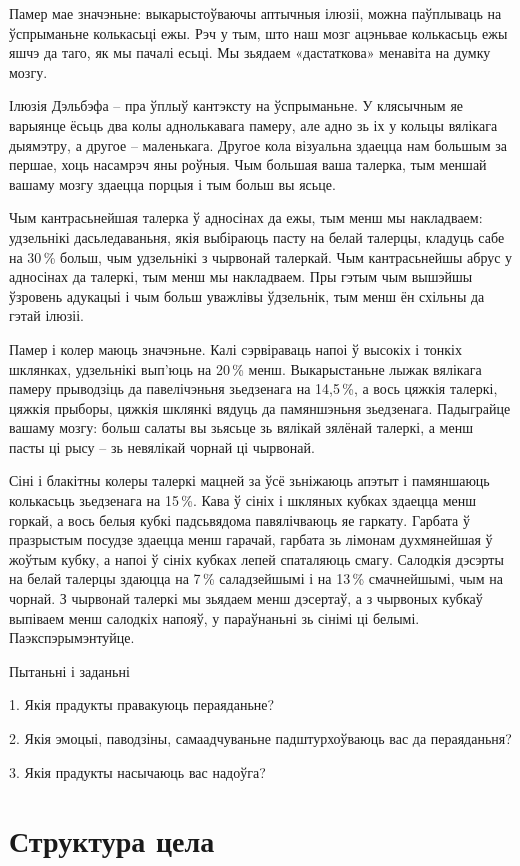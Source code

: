 Памер мае значэньне: выкарыстоўваючы аптычныя ілюзіі, можна паўплываць на ўспрыманьне колькасьці ежы. Рэч у тым, што наш мозг ацэньвае колькасьць ежы яшчэ да таго, як мы пачалі есьці. Мы зьядаем «дастаткова» менавіта на думку мозгу.

Ілюзія Дэльбэфа – пра ўплыў кантэксту на ўспрыманьне. У клясычным яе варыянце ёсьць два колы аднолькавага памеру, але адно зь іх у кольцы вялікага дыямэтру, а другое – маленькага. Другое кола візуальна здаецца нам большым за першае, хоць насамрэч яны роўныя. Чым большая ваша талерка, тым меншай вашаму мозгу здаецца порцыя і тым больш вы ясьце.

Чым кантрасьнейшая талерка ў адносінах да ежы, тым менш мы накладваем: удзельнікі дасьледаваньня, якія выбіраюць пасту на белай талерцы, кладуць сабе на 30\,\% больш, чым удзельнікі з чырвонай талеркай. Чым кантрасьнейшы абрус у адносінах да талеркі, тым менш мы накладваем. Пры гэтым чым вышэйшы ўзровень адукацыі і чым больш уважлівы ўдзельнік, тым менш ён схільны да гэтай ілюзіі.

Памер і колер маюць значэньне. Калі сэрвіраваць напоі ў высокіх і тонкіх шклянках, удзельнікі вып'юць на 20\,\% менш. Выкарыстаньне лыжак вялікага памеру прыводзіць да павелічэньня зьедзенага на 14,5\,\%, а вось цяжкія талеркі, цяжкія прыборы, цяжкія шклянкі вядуць да памяншэньня зьедзенага. Падыграйце вашаму мозгу: больш салаты вы зьясьце зь вялікай зялёнай талеркі, а менш пасты ці рысу – зь невялікай чорнай ці чырвонай.

Сіні і блакітны колеры талеркі мацней за ўсё зьніжаюць апэтыт і памяншаюць колькасьць зьедзенага на 15\,\%. Кава ў сініх і шкляных кубках здаецца менш горкай, а вось белыя кубкі падсьвядома павялічваюць яе гаркату. Гарбата ў празрыстым посудзе здаецца менш гарачай, гарбата зь лімонам духмянейшая ў жоўтым кубку, а напоі ў сініх кубках лепей спаталяюць смагу. Салодкія дэсэрты на белай талерцы здаюцца на 7\,\% саладзейшымі і на 13\,\% смачнейшымі, чым на чорнай. З чырвонай талеркі мы зьядаем менш дэсертаў, а з чырвоных кубкаў выпіваем менш салодкіх напояў, у параўнаньні зь сінімі ці белымі. Паэкспэрымэнтуйце.

Пытаньні і заданьні

1. Якія прадукты правакуюць пераяданьне?

2. Якія эмоцыі, паводзіны, самаадчуваньне падштурхоўваюць вас да пераяданьня?

3. Якія прадукты насычаюць вас надоўга?


\section{Структура цела}

